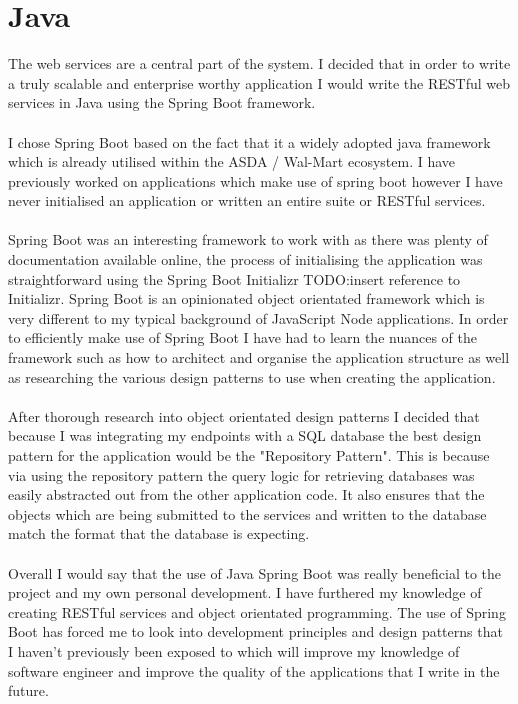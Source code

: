 \documentclass[a4paper,11pt]{report}
\begin{document}
\section{Java}
The web services are a central part of the system. I decided that in order to write a truly scalable
and enterprise worthy application I would write the RESTful web services in Java using the Spring Boot framework.
\\
\\
I chose Spring Boot based on the fact that it a widely adopted java framework which is already utilised
within the ASDA / Wal-Mart ecosystem. I have previously worked on applications which make use of spring
boot however I have never initialised an application or written an entire suite or RESTful services.
\\
\\
Spring Boot was an interesting framework to work with as there was plenty of documentation available online,
the process of initialising the application was straightforward using the Spring Boot Initializr TODO:insert reference to Initializr. 
Spring Boot is an opinionated object orientated framework which is very different to my typical background 
of JavaScript Node applications. In order to efficiently make use of Spring Boot I have had to learn the nuances
of the framework such as how to architect and organise the application structure as well as 
researching the various design patterns to use when creating the application. 
\\
\\
After thorough research into object orientated design patterns I decided that because I was integrating my endpoints
with a SQL database the best design pattern for the application would be the "Repository Pattern". This is because 
via using the repository pattern the query logic for retrieving databases was easily abstracted out from the other 
application code. It also ensures that the objects which are being submitted to the services and written to the database
match the format that the database is expecting.
\\
\\

Overall I would say that the use of Java Spring Boot was really beneficial to the project and my own personal development. I have furthered 
my knowledge of creating RESTful services and object orientated programming. The use of Spring Boot has forced me to look into development 
principles and design patterns that I haven't previously been exposed to which will improve my knowledge of software engineer and improve 
the quality of the applications that I write in the future.
\end{document}
